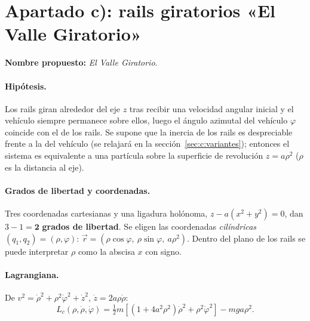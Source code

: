 \documentclass[11pt,a4paper]{article}
\begin{document}
\section{Apartado c): rails giratorios «El Valle Giratorio»}\label{sec:c}
\textbf{Nombre propuesto:} \emph{El Valle Giratorio}.

\paragraph{Hipótesis.} Los rails giran alrededor del eje $z$ tras recibir una velocidad angular inicial y el vehículo siempre permanece sobre ellos, luego
el ángulo azimutal del vehículo $\varphi$ coincide con el de los rails. Se supone que la inercia de los rails es despreciable
frente a la del vehículo (se relajará en la sección~\ref{sec:c:variantes}); entonces el sistema es equivalente a una partícula sobre
la superficie de revolución $z=a\rho^2$ ($\rho$ es la distancia al eje).

\paragraph{Grados de libertad y coordenadas.}
Tres coordenadas cartesianas y una ligadura holónoma, $z-a(x^2+y^2)=0$, dan $3-1=\mathbf 2$ \textbf{grados de libertad}.
Se eligen las coordenadas \emph{cilíndricas} $(q_1,q_2)=(\rho,\varphi)$: $\vec r=(\rho\cos\varphi,\ \rho\sin\varphi,\ a\rho^2)$. Dentro del plano de los rails
se puede interpretar $\rho$ como la abscisa $x$ con signo.

\paragraph{Lagrangiana.} De $v^2=\dot\rho^2+\rho^2\dot\varphi^2+\dot z^2$, $\dot z=2a\rho\dot\rho$:
\begin{equation}\label{eq:Lc}
 L_c(\rho,\dot\rho,\dot\varphi)=\tfrac12m\left[\left(1+4a^2\rho^2\right)\dot\rho^2+\rho^2\dot\varphi^2\right]-mga\rho^2 .
\end{equation}
\end{document}
